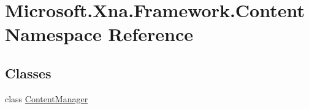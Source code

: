 \hypertarget{namespace_microsoft_1_1_xna_1_1_framework_1_1_content}{}\section{Microsoft.\+Xna.\+Framework.\+Content Namespace Reference}
\label{namespace_microsoft_1_1_xna_1_1_framework_1_1_content}
\subsection*{Classes}
\begin{DoxyCompactItemize}
\item 
class \hyperlink{class_microsoft_1_1_xna_1_1_framework_1_1_content_1_1_content_manager}{Content\+Manager}
\end{DoxyCompactItemize}
